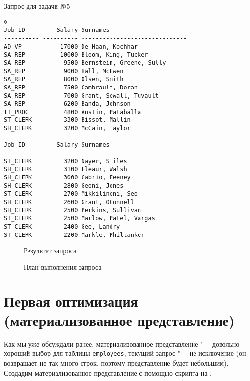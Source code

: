 
\begin{algorithm}[H]
  \caption{Запрос для задачи №5}
  \label{code-task-5}
\end{algorithm}

\begin{verbatim}%
Job ID         Salary Surnames
---------- ---------- ------------------------------
AD_VP           17000 De Haan, Kochhar
SA_REP          10000 Bloom, King, Tucker
SA_REP           9500 Bernstein, Greene, Sully
SA_REP           9000 Hall, McEwen
SA_REP           8000 Olsen, Smith
SA_REP           7500 Cambrault, Doran
SA_REP           7000 Grant, Sewall, Tuvault
SA_REP           6200 Banda, Johnson
IT_PROG          4800 Austin, Pataballa
ST_CLERK         3300 Bissot, Mallin
SH_CLERK         3200 McCain, Taylor

Job ID         Salary Surnames
---------- ---------- ------------------------------
ST_CLERK         3200 Nayer, Stiles
SH_CLERK         3100 Fleaur, Walsh
SH_CLERK         3000 Cabrio, Feeney
SH_CLERK         2800 Geoni, Jones
ST_CLERK         2700 Mikkilineni, Seo
SH_CLERK         2600 Grant, OConnell
SH_CLERK         2500 Perkins, Sullivan
ST_CLERK         2500 Marlow, Patel, Vargas
ST_CLERK         2400 Gee, Landry
ST_CLERK         2200 Markle, Philtanker
\end{verbatim}
\begin{figure}[H]%
  \caption{Результат запроса}
  \label{fig-task-5-output}
\end{figure}


\begin{figure}[H]%
  \caption{План выполнения запроса}
  \label{fig-task-5-plan}
\end{figure}


\section{Первая оптимизация (материализованное представление)}


Как мы уже обсуждали ранее, материализованное представление "--- довольно хороший выбор для таблицы \texttt{employees}, текущий запрос "--- не исключение (он возвращает не так много строк, поэтому представление будет небольшим). Создадим материализованное представление с помощью скрипта на .

